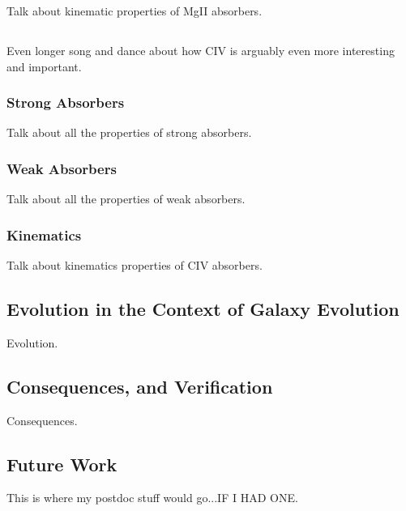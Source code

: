 Talk about kinematic properties of MgII absorbers.

\subsection{{\CIV}}
\label{ch8:CIV}

Even longer song and dance about how CIV is arguably even more interesting and important.

\subsubsection{Strong Absorbers}
\label{ch8:CIVstrong}

Talk about all the properties of strong absorbers.

\subsubsection{Weak Absorbers}
\label{ch8:CIVweak}

Talk about all the properties of weak absorbers.

\subsubsection{Kinematics}
\label{ch8:CIVkinematics}

Talk about kinematics properties of CIV absorbers.

\subsection{Evolution in the Context of Galaxy Evolution}
\label{ch8:evolution}

Evolution.

\subsection{Consequences, and Verification}
\label{ch8:consequences}

Consequences.

\subsection{Future Work}
\label{ch8:futures}

This is where my postdoc stuff would go...IF I HAD ONE.
